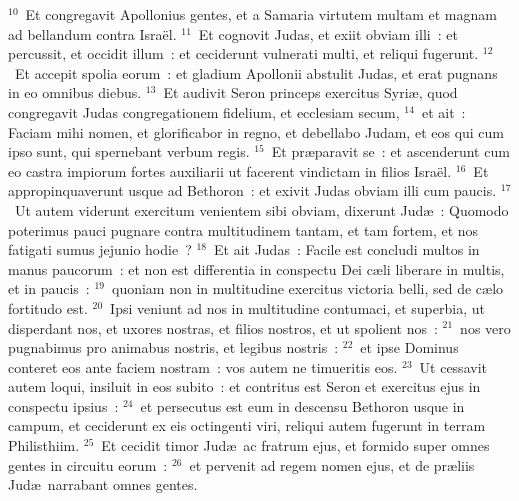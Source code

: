 ${}^{10}$~Et congregavit Apollonius gentes, et a Samaria virtutem multam et magnam ad bellandum contra Isra\"el.
${}^{11}$~Et cognovit Judas, et exiit obviam illi~: et percussit, et occidit illum~: et ceciderunt vulnerati multi, et reliqui fugerunt.
${}^{12}$~Et accepit spolia eorum~: et gladium Apollonii abstulit Judas, et erat pugnans in eo omnibus diebus.
${}^{13}$~Et audivit Seron princeps exercitus Syri\ae , quod congregavit Judas congregationem fidelium, et ecclesiam secum,
${}^{14}$~et ait~: Faciam mihi nomen, et glorificabor in regno, et debellabo Judam, et eos qui cum ipso sunt, qui spernebant verbum regis.
${}^{15}$~Et pr\ae paravit se~: et ascenderunt cum eo castra impiorum fortes auxiliarii ut facerent vindictam in filios Isra\"el.
${}^{16}$~Et appropinquaverunt usque ad Bethoron~: et exivit Judas obviam illi cum paucis.
${}^{17}$~Ut autem viderunt exercitum venientem sibi obviam, dixerunt Jud\ae~: Quomodo poterimus pauci pugnare contra multitudinem tantam, et tam fortem, et nos fatigati sumus jejunio hodie~?
${}^{18}$~Et ait Judas~: Facile est concludi multos in manus paucorum~: et non est differentia in conspectu Dei c\ae li liberare in multis, et in paucis~:
${}^{19}$~quoniam non in multitudine exercitus victoria belli, sed de c\ae lo fortitudo est.
${}^{20}$~Ipsi veniunt ad nos in multitudine contumaci, et superbia, ut disperdant nos, et uxores nostras, et filios nostros, et ut spolient nos~:
${}^{21}$~nos vero pugnabimus pro animabus nostris, et legibus nostris~:
${}^{22}$~et ipse Dominus conteret eos ante faciem nostram~: vos autem ne timueritis eos.
${}^{23}$~Ut cessavit autem loqui, insiluit in eos subito~: et contritus est Seron et exercitus ejus in conspectu ipsius~:
${}^{24}$~et persecutus est eum in descensu Bethoron usque in campum, et ceciderunt ex eis octingenti viri, reliqui autem fugerunt in terram Philisthiim.
${}^{25}$~Et cecidit timor Jud\ae\ ac fratrum ejus, et formido super omnes gentes in circuitu eorum~:
${}^{26}$~et pervenit ad regem nomen ejus, et de pr\ae liis Jud\ae\ narrabant omnes gentes.


